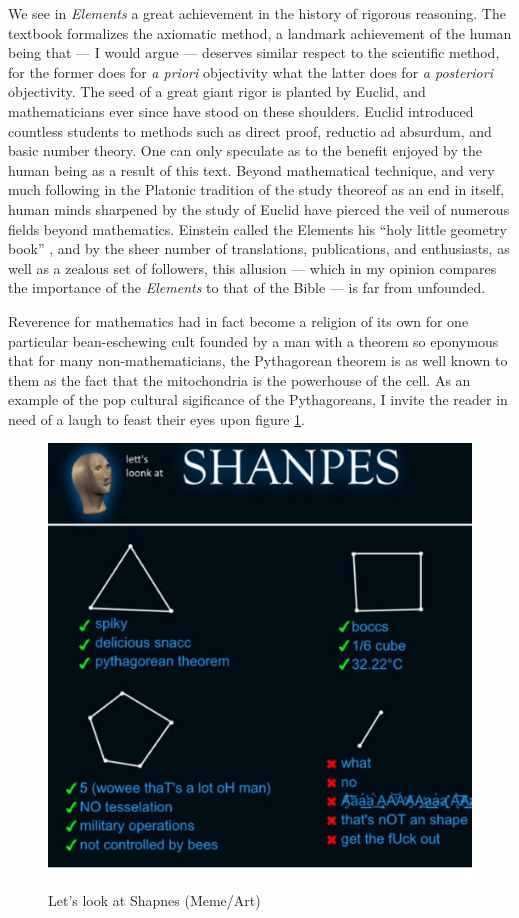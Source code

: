 \documentclass[12pt]{article}
\begin{document}
We see in \textit{Elements} a great achievement
in the history of rigorous reasoning.
The textbook formalizes the axiomatic method,
a landmark achievement of the human being that
--- I would argue ---
deserves similar respect to the scientific method,
for the former does for \textit{a priori} objectivity
what the latter does for \textit{a posteriori} objectivity.
The seed of a great giant rigor is planted by Euclid,
and mathematicians ever since have stood on these shoulders.
Euclid introduced countless students to methods such as
direct proof, reductio ad absurdum, and basic number theory.
One can only speculate as to the benefit enjoyed by
the human being as a result of this text.
Beyond mathematical technique,
and very much following in the Platonic tradition
of the study theoreof as an end in itself,
human minds sharpened by the study of Euclid
have pierced the veil of numerous fields
beyond mathematics.
Einstein called the Elements
his ``holy little geometry book'' \cite{einstein},
and by the sheer number of
translations, publications, and enthusiasts,
as well as a zealous set of followers,
this allusion
--- which in my opinion compares the importance of the \textit{Elements}
to that of the Bible ---
is far from unfounded.

Reverence for mathematics had in fact
become a religion of its own
for one particular bean-eschewing
cult founded by a man with a theorem
so eponymous that for many non-mathematicians,
the Pythagorean theorem is as well known to them
as the fact that the mitochondria is the powerhouse of the cell.
As an example of the pop cultural sigificance of the Pythagoreans,
I invite the reader in need of a laugh to feast their eyes upon figure \ref{fig2}.


\begin{figure}
	\includegraphics[scale=0.4]{shanpes.png}
	\centering
	\caption{Let's look at Shapnes (Meme/Art) \cite{shanpes}}
	\label{fig2}
\end{figure}
\end{document}
